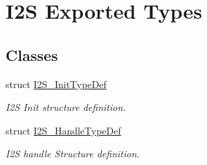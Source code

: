 \hypertarget{group___i2_s___exported___types}{}\section{I2S Exported Types}
\label{group___i2_s___exported___types}
\subsection*{Classes}
\begin{DoxyCompactItemize}
\item 
struct \hyperlink{struct_i2_s___init_type_def}{I2\+S\+\_\+\+Init\+Type\+Def}
\begin{DoxyCompactList}\small\item\em I2S Init structure definition. \end{DoxyCompactList}\item 
struct \hyperlink{struct_i2_s___handle_type_def}{I2\+S\+\_\+\+Handle\+Type\+Def}
\begin{DoxyCompactList}\small\item\em I2S handle Structure definition. \end{DoxyCompactList}\end{DoxyCompactItemize}
